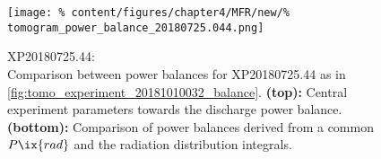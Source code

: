                     \newline%
%
                    \begin{figure}[t]%
                        \centering%
                        \captionsetup{width=.4\textwidth}%
                        \begin{minipage}[c]{.4\textwidth}%
                            \centering%
                            \caption{%
                                XP20180725.44:\\%
                                Comparison between power balances for XP20180725.44 as in \cref{fig:tomo_experiment_20181010032_balance}. \textbf{(top):} Central experiment parameters towards the discharge power balance. \textbf{(bottom):} Comparison of power balances derived from a common $P\ix{rad}$ and the radiation distribution integrals.}\label{fig:tomo_experiment_201810725044_balance}%
                        \end{minipage}%
                        \hfill%
                        \begin{minipage}[c]{0.53\textwidth}%
                            \centering%
                            \texttt{[image: \%
                                content/figures/chapter4/MFR/new/\%
                                tomogram\_power\_balance\_20180725.044.png]}%
                        \end{minipage}%
                    \end{figure}%
%
